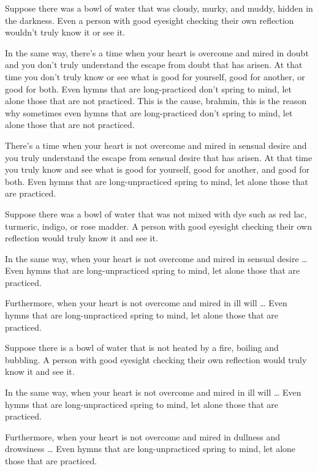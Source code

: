 \documentclass[12pt,openany]{book}%
\begin{document}
Suppose there was a bowl of water that was cloudy, murky, and muddy, hidden in the darkness. Even a person with good eyesight checking their own reflection wouldn’t truly know it or see it. 

In the same way, there’s a time when your heart is overcome and mired in doubt and you don’t truly understand the escape from doubt that has arisen. At that time you don’t truly know or see what is good for yourself, good for another, or good for both. Even hymns that are long-practiced don’t spring to mind, let alone those that are not practiced. This is the cause, brahmin, this is the reason why sometimes even hymns that are long-practiced don’t spring to mind, let alone those that are not practiced. 

There’s a time when your heart is not overcome and mired in sensual desire and you truly understand the escape from sensual desire that has arisen. At that time you truly know and see what is good for yourself, good for another, and good for both. Even hymns that are long-unpracticed spring to mind, let alone those that are practiced. 

Suppose there was a bowl of water that was not mixed with dye such as red lac, turmeric, indigo, or rose madder. A person with good eyesight checking their own reflection would truly know it and see it. 

In the same way, when your heart is not overcome and mired in sensual desire … Even hymns that are long-unpracticed spring to mind, let alone those that are practiced. 

Furthermore, when your heart is not overcome and mired in ill will … Even hymns that are long-unpracticed spring to mind, let alone those that are practiced. 

Suppose there is a bowl of water that is not heated by a fire, boiling and bubbling. A person with good eyesight checking their own reflection would truly know it and see it. 

In the same way, when your heart is not overcome and mired in ill will … Even hymns that are long-unpracticed spring to mind, let alone those that are practiced. 

Furthermore, when your heart is not overcome and mired in dullness and drowsiness … Even hymns that are long-unpracticed spring to mind, let alone those that are practiced. 
\end{document}
